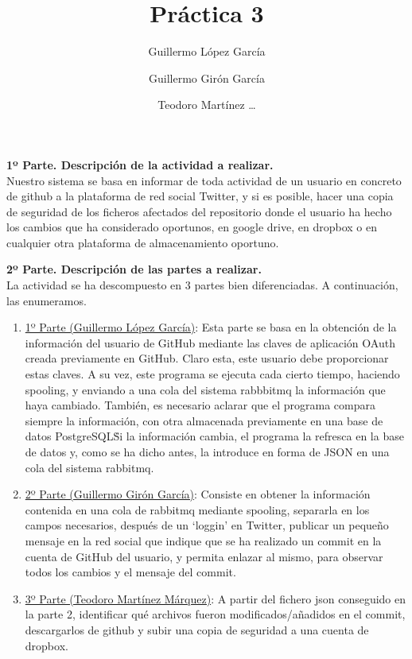 \documentclass{article}
\title{Práctica 3}
\author{
Guillermo López García
\and
Guillermo Girón García
\and
Teodoro Martínez \ldots
}
\begin{document}
\maketitle
\textbf{1º Parte. Descripción de la actividad a realizar.}\\
Nuestro sistema se basa en informar de toda actividad de un usuario
en concreto de github a la plataforma de red social Twitter, y si es
posible, hacer una copia de seguridad de los ficheros afectados
del repositorio donde el usuario ha hecho los cambios que ha considerado
oportunos, en google drive, en dropbox o en cualquier otra plataforma
de almacenamiento oportuno.

\textbf{2º Parte. Descripción de las partes a realizar.}\\
La actividad se ha descompuesto en 3 partes bien diferenciadas.
A continuación, las enumeramos.
\begin{enumerate}
    \item \underline{1º Parte (Guillermo López García)}: Esta parte se
        basa en la obtención de la información del usuario de GitHub mediante
        las claves de aplicación OAuth creada previamente en GitHub.
        Claro esta, este usuario debe proporcionar estas claves.
        A su vez, este programa se ejecuta cada cierto tiempo, haciendo spooling,
        y enviando a una cola del sistema rabbbitmq la información que haya cambiado.
        También, es necesario aclarar que el programa compara siempre la información,
        con otra almacenada previamente en una base de datos PostgreSQL\. Si la
        información cambia, el programa la refresca en la base de datos y, como se
        ha dicho antes, la introduce en forma de JSON en una cola del sistema
        rabbitmq.
    \item \underline{2º Parte (Guillermo Girón García)}: Consiste en obtener la información
        contenida en una cola de rabbitmq mediante spooling, separarla en los campos
        necesarios, después de un `loggin' en Twitter, publicar un pequeño mensaje en 
        la red social que indique que se ha realizado un commit en la cuenta de GitHub del
        usuario, y permita enlazar al mismo, para observar todos los cambios y el mensaje del
        commit. 
    \item \underline{3º Parte (Teodoro Martínez Márquez)}: A partir del fichero json 		conseguido en la parte 2, identificar qué archivos fueron modificados/añadidos en el 		commit, descargarlos de github y subir una copia de seguridad a una cuenta de dropbox.
\end{enumerate}
\end{document}
